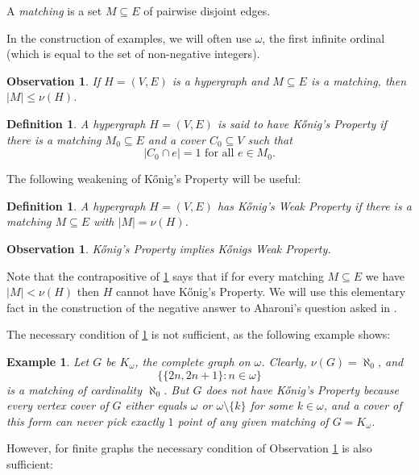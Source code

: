 \documentclass[12pt]{amsart}
\newtheorem{definition}[lemma]{\bf Definition}
\newtheorem{observation}[lemma]{\bf Observation}
\newtheorem{example}[lemma]{\bf Example}
\begin{document}
A {\em matching} is a set $M\subseteq E$ of pairwise disjoint
edges.

In the construction of examples, we will often use $\omega$, the
first infinite ordinal (which is equal to the set of non-negative 
integers).

\begin{observation}\label{obs1}
If $H=(V,E)$ is a hypergraph and $M\subseteq E$ is a matching,
then $|M|\leq \nu(H)$.
\end{observation}

\begin{definition} {\em A hypergraph $H = (V,E)$ is said to have 
{\em K\H{o}nig's Property}
if there is a matching $M_0 \subseteq E$ and a cover $C_0\subseteq V$ such
that $$|C_0 \cap e| = 1 \text{ for all } e\in M_0.$$
}
\end{definition}

The following weakening of K\H{o}nig's Property will be useful:

\begin{definition} {\em A hypergraph $H = (V,E)$  has {\em K\H{o}nig's Weak Property}
if there is a matching $M\subseteq E$ with $|M| = \nu(H)$.
}
\end{definition}

\begin{observation} \label{eqobs} K\H{o}nig's Property implies
K\H{o}nigs Weak Property.
\end{observation}

Note that the contrapositive of \ref{eqobs} says that
if for every matching $M\subseteq E$ we have $|M|<\nu(H)$
then $H$ cannot have K\H{o}nig's Property. We will use
this elementary fact in the construction of the negative
answer to Aharoni's question asked in \cite{Ah}.

The necessary condition of \ref{eqobs}
is not sufficient, as the following example shows:

\begin{example} {\em Let $G$ be $K_\omega$, the complete graph  on $\omega$.
Clearly, $\nu(G) = \aleph_0$, and $$\big\{\{2n, 2n+1\}: n\in \omega\big\}$$
is a matching of cardinality $\aleph_0$. But $G$ does not have K\H{o}nig's 
Property because every vertex cover of $G$ either equals $\omega$ or 
$\omega\setminus\{k\}$ for some $k\in \omega$, and a cover of this form
can never pick exactly $1$ point of any given matching of $G = K_\omega$.
} 
\end{example}

However, for finite graphs the necessary condition of Observation \ref{eqobs} 
is also sufficient:
\end{document}
